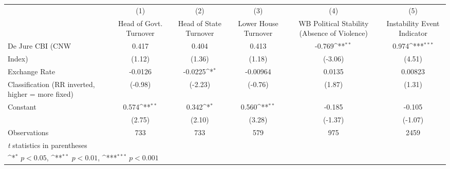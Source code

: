 {
\def\sym#1{\ifmmode^{#1}\else\(^{#1}\)\fi}
\begin{tabular}{l*{5}{c}}
\hline\hline
                    &\multicolumn{1}{c}{(1)}&\multicolumn{1}{c}{(2)}&\multicolumn{1}{c}{(3)}&\multicolumn{1}{c}{(4)}&\multicolumn{1}{c}{(5)}\\
                    &\multicolumn{1}{c}{Head of Govt. Turnover}&\multicolumn{1}{c}{Head of State Turnover}&\multicolumn{1}{c}{Lower House Turnover}&\multicolumn{1}{c}{WB Political Stability (Absence of Violence)}&\multicolumn{1}{c}{Instability Event Indicator}\\
\hline
De Jure CBI (CNW    &       0.417         &       0.404         &       0.413         &      -0.769\sym{**} &       0.974\sym{***}\\
Index)              &      (1.12)         &      (1.36)         &      (1.18)         &     (-3.06)         &      (4.51)         \\
[1em]
Exchange Rate       &     -0.0126         &     -0.0225\sym{*}  &    -0.00964         &      0.0135         &     0.00823         \\
Classification (RR inverted, higher = more fixed)&     (-0.98)         &     (-2.23)         &     (-0.76)         &      (1.87)         &      (1.31)         \\
[1em]
Constant            &       0.574\sym{**} &       0.342\sym{*}  &       0.560\sym{**} &      -0.185         &      -0.105         \\
                    &      (2.75)         &      (2.10)         &      (3.28)         &     (-1.37)         &     (-1.07)         \\
\hline
Observations        &         733         &         733         &         579         &         975         &        2459         \\
\hline\hline
\multicolumn{6}{l}{\footnotesize \textit{t} statistics in parentheses}\\
\multicolumn{6}{l}{\footnotesize \sym{*} \(p<0.05\), \sym{**} \(p<0.01\), \sym{***} \(p<0.001\)}\\
\end{tabular}
}
